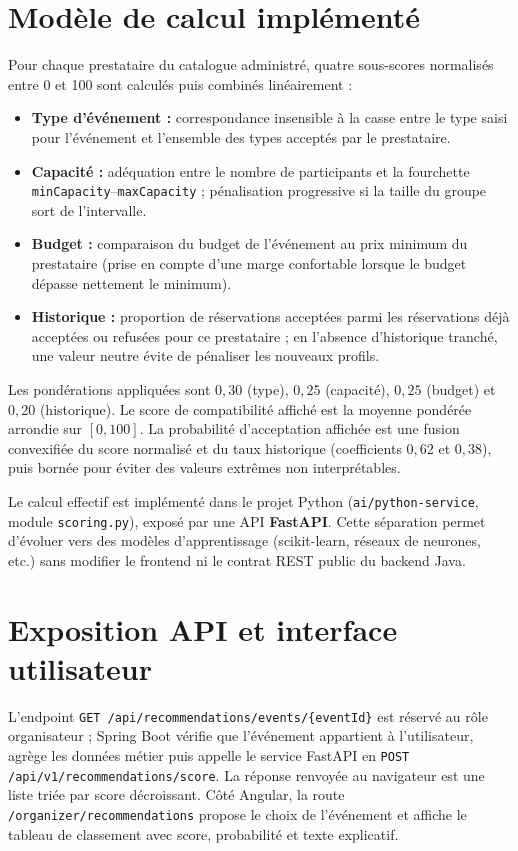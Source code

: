 \documentclass[a4paper,12pt]{report}
\begin{document}
\section{Modèle de calcul implémenté}

Pour chaque prestataire du catalogue administré, quatre sous-scores normalisés entre 0 et 100 sont calculés puis combinés linéairement :
\begin{itemize}[leftmargin=*]
  \item \textbf{Type d'événement :} correspondance insensible à la casse entre le type saisi pour l'événement et l'ensemble des types acceptés par le prestataire.
  \item \textbf{Capacité :} adéquation entre le nombre de participants et la fourchette \texttt{minCapacity}--\texttt{maxCapacity} ; pénalisation progressive si la taille du groupe sort de l'intervalle.
  \item \textbf{Budget :} comparaison du budget de l'événement au prix minimum du prestataire (prise en compte d'une marge confortable lorsque le budget dépasse nettement le minimum).
  \item \textbf{Historique :} proportion de réservations acceptées parmi les réservations déjà acceptées ou refusées pour ce prestataire ; en l'absence d'historique tranché, une valeur neutre évite de pénaliser les nouveaux profils.
\end{itemize}

Les pondérations appliquées sont $0{,}30$ (type), $0{,}25$ (capacité), $0{,}25$ (budget) et $0{,}20$ (historique). Le score de compatibilité affiché est la moyenne pondérée arrondie sur $[0,100]$. La probabilité d'acceptation affichée est une fusion convexifiée du score normalisé et du taux historique (coefficients $0{,}62$ et $0{,}38$), puis bornée pour éviter des valeurs extrêmes non interprétables.

Le calcul effectif est implémenté dans le projet Python (\texttt{ai/python-service}, module \texttt{scoring.py}), exposé par une API \textbf{FastAPI}. Cette séparation permet d'évoluer vers des modèles d'apprentissage (scikit-learn, réseaux de neurones, etc.) sans modifier le frontend ni le contrat REST public du backend Java.

\section{Exposition API et interface utilisateur}

L'endpoint \texttt{GET /api/recommendations/events/\{eventId\}} est réservé au rôle organisateur ; Spring Boot vérifie que l'événement appartient à l'utilisateur, agrège les données métier puis appelle le service FastAPI en \texttt{POST /api/v1/recommendations/score}. La réponse renvoyée au navigateur est une liste triée par score décroissant. Côté Angular, la route \texttt{/organizer/recommendations} propose le choix de l'événement et affiche le tableau de classement avec score, probabilité et texte explicatif.
\end{document}
